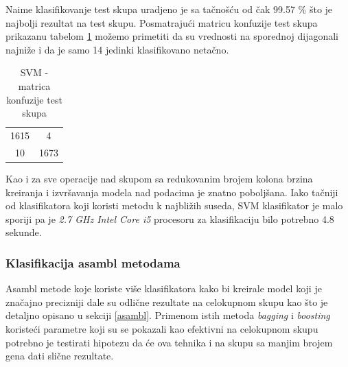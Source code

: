 \documentclass[a4paper]{article}
\begin{document}
Naime klasifikovanje test skupa uradjeno je sa tačnošću od čak 99.57 \% što je najbolji rezultat na test skupu. Posmatrajući matricu konfuzije test skupa prikazanu tabelom \ref{table:redPot} možemo primetiti da su vrednosti na sporednoj dijagonali najniže i da je samo 14 jedinki klasifikovano netačno.

\begin{table}[h!]
\centering
\begin{tabular}{|c c|}
  \hline
  1615 & 4 \\
  10 & 1673  \\
 \hline
\end{tabular}
\caption{SVM - matrica konfuzije test skupa}
\label{table:redPot}
\end{table}

Kao i za sve operacije nad skupom sa redukovanim brojem kolona brzina kreiranja i izvršavanja modela nad podacima je znatno poboljšana. Iako tačniji od klasifikatora koji koristi metodu k najbližih suseda, SVM klasifikator je malo sporiji pa je \textit{2.7 GHz Intel Core i5} procesoru za klasifikaciju bilo potrebno 4.8 sekunde.


\subsubsection{Klasifikacija asambl metodama}
\label{asamblskr}

Asambl metode koje koriste više klasifikatora kako bi kreirale model koji je značajno precizniji dale su odlične rezultate na celokupnom skupu kao što je detaljno opisano u sekciji \ref{asambl}. Primenom istih metoda \textit{bagging} i \textit{boosting} koristeći parametre koji su se pokazali kao efektivni na celokupnom skupu potrebno je testirati hipotezu da će ova tehnika i na skupu sa manjim brojem gena dati slične rezultate.
\end{document}
